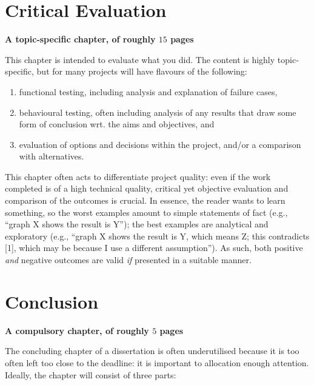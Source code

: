 \documentclass[
    author={Jacob Daniel Halsey},
    supervisor={Prof. Awais Rashid},
    degree={BSc},
    title={Building a Testbed for Evaluating Privacy Enhancing Technologies  (PETs)},
    subtitle={},
    type={software development},
    year={2021}
]{dissertation}
\begin{document}
\chapter{Critical Evaluation}
\label{chap:evaluation}

{\bf A topic-specific chapter, of roughly $15$ pages} 
\vspace{1cm} 

\noindent
This chapter is intended to evaluate what you did.  The content is highly 
topic-specific, but for many projects will have flavours of the following:

\begin{enumerate}
\item functional  testing, including analysis and explanation of failure 
      cases,
\item behavioural testing, often including analysis of any results that 
      draw some form of conclusion wrt. the aims and objectives,
      and
\item evaluation of options and decisions within the project, and/or a
      comparison with alternatives.
\end{enumerate}

\noindent
This chapter often acts to differentiate project quality: even if the work
completed is of a high technical quality, critical yet objective evaluation 
and comparison of the outcomes is crucial.  In essence, the reader wants to
learn something, so the worst examples amount to simple statements of fact 
(e.g., ``graph X shows the result is Y''); the best examples are analytical 
and exploratory (e.g., ``graph X shows the result is Y, which means Z; this 
contradicts [1], which may be because I use a different assumption'').  As 
such, both positive {\em and} negative outcomes are valid {\em if} presented 
in a suitable manner.

\chapter{Conclusion}
\label{chap:conclusion}

{\bf A compulsory chapter,     of roughly $5$ pages} 
\vspace{1cm} 

\noindent
The concluding chapter of a dissertation is often underutilised because it 
is too often left too close to the deadline: it is important to allocation
enough attention.  Ideally, the chapter will consist of three parts:
\end{document}
